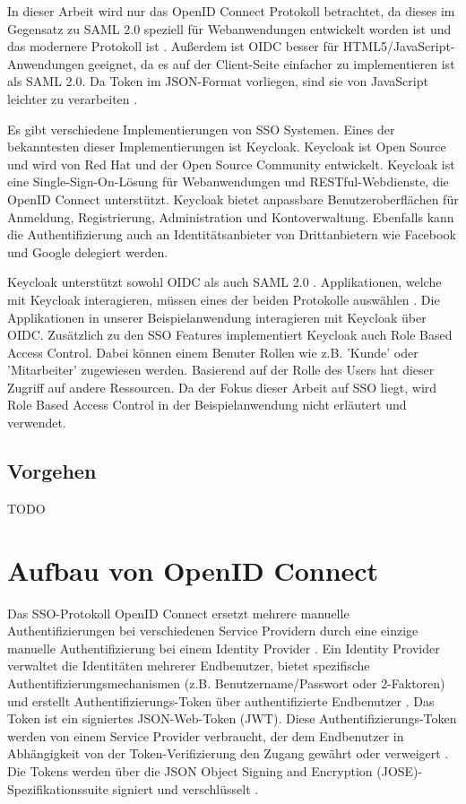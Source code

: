 In dieser Arbeit wird nur das OpenID Connect Protokoll betrachtet, da dieses im Gegensatz zu SAML 2.0 speziell für Webanwendungen entwickelt worden ist und das modernere Protokoll ist \cite{EB37}. Außerdem ist OIDC besser für HTML5/JavaScript-Anwendungen geeignet, da es auf der Client-Seite einfacher zu implementieren ist als SAML 2.0. Da Token im JSON-Format vorliegen, sind sie von JavaScript leichter zu verarbeiten \cite{ssoProtocols}.

Es gibt verschiedene Implementierungen von SSO Systemen. Eines der bekanntesten dieser Implementierungen ist Keycloak. Keycloak ist Open Source und wird von Red Hat und der Open Source Community entwickelt. Keycloak ist eine Single-Sign-On-Lösung für Webanwendungen und RESTful-Webdienste, die OpenID Connect unterstützt. Keycloak bietet anpassbare Benutzeroberflächen für Anmeldung, Registrierung, Administration und Kontoverwaltung. Ebenfalls kann die Authentifizierung auch an Identitätsanbieter von Drittanbietern wie Facebook und Google delegiert werden. \cite{keycloakDocs}

Keycloak unterstützt sowohl OIDC als auch SAML 2.0 \cite{EB44}. Applikationen, welche mit Keycloak interagieren, müssen eines der beiden Protokolle auswählen \cite{EB44}. Die Applikationen in unserer Beispielanwendung interagieren mit Keycloak über OIDC. Zusätzlich zu den SSO Features implementiert Keycloak auch Role Based Access Control. Dabei können einem Benuter Rollen wie z.B. 'Kunde' oder 'Mitarbeiter' zugewiesen werden. Basierend auf der Rolle des Users hat dieser Zugriff auf andere Ressourcen. Da der Fokus dieser Arbeit auf SSO liegt, wird Role Based Access Control in der Beispielanwendung nicht erläutert und verwendet.

\subsection{Vorgehen}

TODO



\section{Aufbau von OpenID Connect}

Das SSO-Protokoll OpenID Connect ersetzt mehrere manuelle Authentifizierungen bei verschiedenen Service Providern durch eine einzige manuelle Authentifizierung bei einem Identity Provider \cite{mladenov2016security}. Ein Identity Provider verwaltet die Identitäten mehrerer Endbenutzer, bietet spezifische Authentifizierungsmechanismen (z.B. Benutzername/Passwort oder 2-Faktoren) und erstellt Authentifizierungs-Token über authentifizierte Endbenutzer \cite{mladenov2016security}. Das Token ist ein signiertes JSON-Web-Token (JWT). Diese Authentifizierungs-Token werden von einem Service Provider verbraucht, der dem Endbenutzer in Abhängigkeit von der Token-Verifizierung den Zugang gewährt oder verweigert \cite{mladenov2016security}. Die Tokens werden über die JSON Object Signing and Encryption (JOSE)-Spezifikationssuite signiert und verschlüsselt \cite{OAuth2inAction}.

